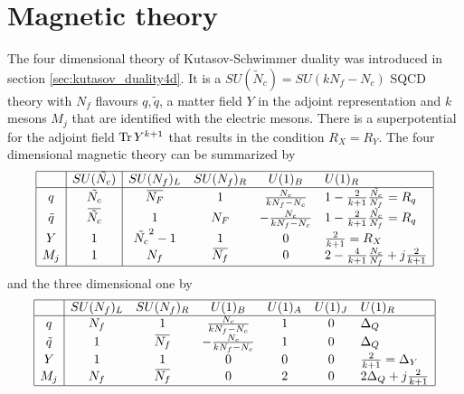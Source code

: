 \section{Magnetic theory}
The four dimensional theory of Kutasov-Schwimmer duality was introduced in section \ref{sec:kutasov_duality4d}. 
It is a $SU(\tilde{N}_c) = SU( k N_f - N_c)$ SQCD theory with $N_f$ flavours $q,\tilde{q} $, a matter field $Y$ in the adjoint representation and $k$ mesons $M_j$ that are identified with the electric mesons. There is a superpotential for the adjoint field $ \mathrm{Tr } \, Y^{k+1}$ that results in the condition $R_X = R_Y$.
The four dimensional magnetic theory can be summarized by
\begin{equation}
\begin{array}{|c |  c | c c c l |}
\hline
 & SU(\tilde{N_c})  & SU(N_f)_L  &SU(N_f)_R   & U(1)_B &  U(1)_R \\
\hline
q &  \tilde{N_c} & \overbar{N_F}  & 1   &   \frac{N_c}{k N_f - N_c }  &  1 - \frac{2}{k+1} \frac{ \tilde{N_c}}{N_f} = R_q   \\
\tilde{q} & \overbar{\tilde{N_c}}  & 1  &  N_F  & -\frac{N_c}{k N_f - N_c }   &   1 - \frac{2}{k+1} \frac{\tilde{N_c}}{N_f}  = R_q   \\
Y & 1  &  \tilde{N_c}^2-1  & 1    & 0   &   \frac{2}{k+1} = R_X  \\
 M_j & 1 & N_f &  \overbar{N_f} & 0 & 2 - \frac{4}{k+1} \frac{N_c}{N_f} + j \frac{2}{k+1} \\
 \hline
\end{array}
\end{equation}
%
and the three dimensional one by
%
\begin{equation}
\begin{array}{ | c | c c c c c l | } 
 \hline
	& SU(N_f)_L & SU(N_f)_R & U(1)_B & U(1)_A & U(1)_J  & U(1)_R   \\
 \hline
 q & N_f & 1 & \frac{N_c}{k N_f - N_c} & 1 & 0   & \Delta_Q  \\  
 \tilde{q} & 1 & \overbar{N_f}& - \frac{N_c}{k N_f - N_c}  & 1 & 0 & \Delta_Q      \\  
	Y & 1 & 1  & 0 & 0 & 0 & \frac{2}{k+1}= \Delta_Y    \\ 
	M_j & N_f & \overbar{N_f} & 0 & 2  &  0& 2 \Delta_Q + j \frac{2}{k+1} \\
 \hline
\end{array}
\label{tab:kim-park-magnetic}
\end{equation}




